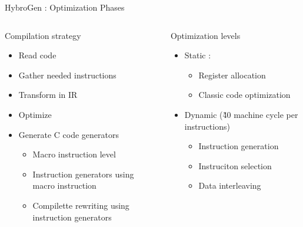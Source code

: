 \begin{Frame}{HybroGen : Optimization Phases}
 \begin{columns}[t]
  \begin{column}{\BW}
    \begin{block}{Compilation strategy}
      \begin{itemize}
        \item Read code
        \item Gather needed instructions
        \item Transform in IR
        \item Optimize
        \item Generate C code generators
          \begin{itemize}
          \item Macro instruction level
          \item Instruction generators using macro instruction
          \item Compilette rewriting using instruction generators
          \end{itemize}
      \end{itemize}
    \end{block}
  \end{column}
  \begin{column}{\BW}
    \begin{block}{Optimization levels}
      \begin{itemize}
      \item Static :
        \begin{itemize}
        \item Register allocation
        \item Classic code optimization
        \end{itemize}
      \item Dynamic (\~40 machine cycle per instructions)
        \begin{itemize}
        \item Instruction generation
        \item Instruciton selection
        \item Data interleaving
        \end{itemize}
      \end{itemize}
    \end{block}
  \end{column}

 \end{columns}
\end{Frame}
